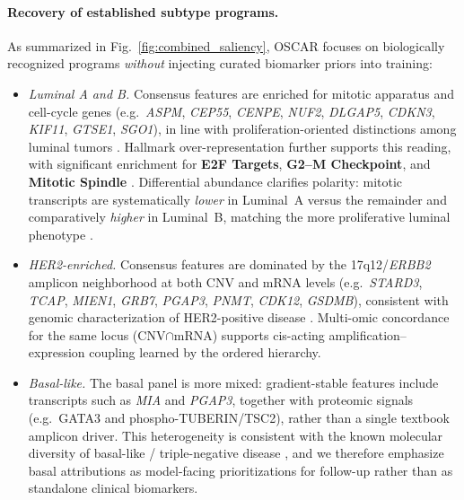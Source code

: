 \documentclass[lettersize,journal]{IEEEtran}
\begin{document}
\paragraph{Recovery of established subtype programs.}
As summarized in Fig.~\ref{fig:combined_saliency}, OSCAR focuses on biologically recognized programs
\emph{without} injecting curated biomarker priors into training:

\begin{itemize}
    \item \textit{Luminal A and B.}
    Consensus features are enriched for mitotic apparatus and cell-cycle genes
    (e.g.\ \textit{ASPM}, \textit{CEP55}, \textit{CENPE}, \textit{NUF2}, \textit{DLGAP5}, \textit{CDKN3}, \textit{KIF11},
    \textit{GTSE1}, \textit{SGO1}), in line with proliferation-oriented distinctions among luminal tumors
    \cite{Gao2018LuminalA,Ades2014LuminalB,PerezPena2017MitoticLumA,Althobiti2024ASPM}.
    Hallmark over-representation further supports this reading, with significant enrichment for
    \textbf{E2F Targets}, \textbf{G2--M Checkpoint}, and \textbf{Mitotic Spindle}
    \cite{Malorni2016RBsig,Liberzon2015Hallmark}.
    Differential abundance clarifies polarity: mitotic transcripts are systematically \emph{lower} in Luminal~A versus
    the remainder and comparatively \emph{higher} in Luminal~B, matching the more proliferative luminal phenotype
    \cite{Ades2014LuminalB}.

    \item \textit{HER2-enriched.}
    Consensus features are dominated by the 17q12/\textit{ERBB2} amplicon neighborhood at both CNV and mRNA levels
    (e.g.\ \textit{STARD3}, \textit{TCAP}, \textit{MIEN1}, \textit{GRB7}, \textit{PGAP3}, \textit{PNMT}, \textit{CDK12}, \textit{GSDMB}),
    consistent with genomic characterization of HER2-positive disease
    \cite{Staaf2010HER2,Kao2006Amplicon,Sahlberg2013HER2Amplicon}.
    Multi-omic concordance for the same locus (CNV$\cap$mRNA) supports cis-acting amplification--expression coupling learned by the ordered hierarchy.

    \item \textit{Basal-like.}
    The basal panel is more mixed: gradient-stable features include transcripts such as \textit{MIA} and \textit{PGAP3},
    together with proteomic signals (e.g.\ GATA3 and phospho-TUBERIN/TSC2), rather than a single textbook amplicon driver.
    This heterogeneity is consistent with the known molecular diversity of basal-like / triple-negative disease
    \cite{Koboldt2012BRCA}, and we therefore emphasize basal attributions as model-facing prioritizations for follow-up
    rather than as standalone clinical biomarkers.
\end{itemize}
\end{document}
